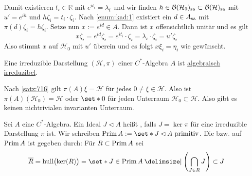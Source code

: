 \begin{beweis}
\begin{enumerate}[label={Teil \Roman*.},wide,font=\bfseries\scshape,itemsep=2pt]
		Damit existieren $t_i \in \mathbb{R}$ mit $e^{i t_i}=\lambda_i$ und wir finden $h \in \mathcal{B}(\mathcal{H}_0)_{\mathrm{sa}} \subset \mathcal{B}(\mathcal{H})_{\mathrm{sa}}$ mit $u'=e^{i h}$ und $h \zeta_i = t_i \cdot \zeta_i$.
		Nach \ref{enum:kad:1} existiert ein $d \in A_{\mathrm{sa}}$ mit $\pi(d) \zeta_i = h \zeta_i$.
		Setze nun $x := e^{i d} \in A$. 
		Dann ist $x$ offensichtlich unitär und es gilt
		\[
			x \zeta_i= e^{i d} \zeta_i = e^{i t_i} \cdot \zeta_i = \lambda_i \cdot \zeta_i = u' \zeta_i
		\]
		Also stimmt $x$ auf $\mathcal{H}_0$ mit $u'$ überein und es folgt $x \xi_i= \eta_i$ wie gewünscht. \qedhere
	\end{enumerate}
\end{beweis}

\begin{korollar}[{name=[irreduzibel impliziert algebraisch irreduzibel]},label=korr:717]
	Eine irreduzible Darstellung $(\mathcal{H},\pi)$ einer $C^*$-Algebra $A$ ist \hyperref[def:510]{algebraisch irreduzibel}.
\end{korollar}
\begin{beweis}
	Nach \autoref{satz:716} gilt $\pi(A)\xi=\mathcal{H}$ für jedes $0 \neq \xi \in \mathcal{H}$.
	Also ist $\pi(A)(\mathcal{H}_0)=\mathcal{H}$ oder $\set*{0}$ für jeden Unterraum $\mathcal{H}_0 \subset \mathcal{H}$.
	Also gibt es keinen nichtrivialen invarianten Unterraum.
\end{beweis}

\begin{definition}[label=def:718,{name=[primitives Ideal]}]
	Sei $A$ eine $C^*$-Algebra.
	Ein Ideal $J \lhd A$ heißt , falls $J= \ker \pi$ für eine irreduzible Darstellung $\pi$ ist.
	Wir schreiben $\Prim A  := \set*{J \lhd A \text{ primitiv}}$.
	Die  bzw.  auf $\operatorname{Prim} A$ ist gegeben durch:
	Für $R \subset \operatorname{Prim} A$ sei
	\[
		\overline{R} = \hull\enbrace[\big]{\ker(R)} = \set*{J \in \Prim A \given \enbrace*{\bigcap_{J \in R} J} \subset J}
	\]  
\end{definition}

